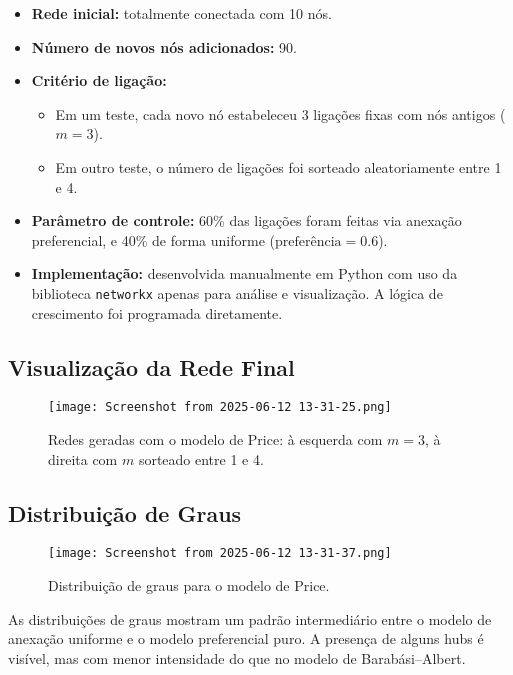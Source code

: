 \documentclass{article}
\begin{document}
\begin{itemize}
    \item \textbf{Rede inicial:} totalmente conectada com 10 nós.
    \item \textbf{Número de novos nós adicionados:} 90.
    \item \textbf{Critério de ligação:}
    \begin{itemize}
        \item Em um teste, cada novo nó estabeleceu 3 ligações fixas com nós antigos (\(m = 3\)).
        \item Em outro teste, o número de ligações foi sorteado aleatoriamente entre 1 e 4.
    \end{itemize}
    \item \textbf{Parâmetro de controle:} 60\% das ligações foram feitas via anexação preferencial, e 40\% de forma uniforme (\(\text{preferência} = 0.6\)).
    \item \textbf{Implementação:} desenvolvida manualmente em Python com uso da biblioteca \texttt{networkx} apenas para análise e visualização. A lógica de crescimento foi programada diretamente.
\end{itemize}

\subsection*{Visualização da Rede Final}

\begin{figure}[h]
\begin{center}
    \texttt{[image: Screenshot from 2025-06-12 13-31-25.png]}
\end{center}
\caption{Redes geradas com o modelo de Price: à esquerda com \(m = 3\), à direita com \(m\) sorteado entre 1 e 4.}
\end{figure}

\subsection*{Distribuição de Graus}

\begin{figure}[h]
\begin{center}
    \texttt{[image: Screenshot from 2025-06-12 13-31-37.png]}
\end{center}
\caption{Distribuição de graus para o modelo de Price.}
\end{figure}

As distribuições de graus mostram um padrão intermediário entre o modelo de anexação uniforme e o modelo preferencial puro. A presença de alguns hubs é visível, mas com menor intensidade do que no modelo de Barabási–Albert.
\end{document}

